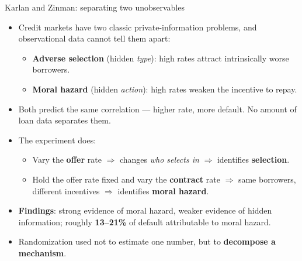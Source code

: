 \documentclass[
  11pt,
  ignorenonframetext,
  aspectratio=169,
]{beamer}
\providecommand{\tightlist}{%
  \setlength{\itemsep}{0pt}\setlength{\parskip}{0pt}}
\begin{document}
\begin{frame}{Karlan and Zinman: separating two unobservables}
\protect{}\label{karlan-and-zinman-separating-two-unobservables}
\begin{itemize}
\tightlist
\item
  Credit markets have two classic private-information problems, and
  observational data cannot tell them apart:

  \begin{itemize}
  \tightlist
  \item
    \textbf{Adverse selection} (hidden \emph{type}): high rates attract
    intrinsically worse borrowers.
  \item
    \textbf{Moral hazard} (hidden \emph{action}): high rates weaken the
    incentive to repay.
  \end{itemize}
\item
  Both predict the same correlation --- higher rate, more default. No
  amount of loan data separates them.
\item
  The experiment does:

  \begin{itemize}
  \tightlist
  \item
    Vary the \textbf{offer} rate \(\Rightarrow\) changes \emph{who
    selects in} \(\Rightarrow\) identifies \textbf{selection}.
  \item
    Hold the offer rate fixed and vary the \textbf{contract} rate
    \(\Rightarrow\) same borrowers, different incentives \(\Rightarrow\)
    identifies \textbf{moral hazard}.
  \end{itemize}
\item
  \textbf{Findings}: strong evidence of moral hazard, weaker evidence of
  hidden information; roughly \textbf{13--21\%} of default attributable
  to moral hazard.
\item
  Randomization used not to estimate one number, but to
  \textbf{decompose a mechanism}.
\end{itemize}
\end{frame}
\end{document}
